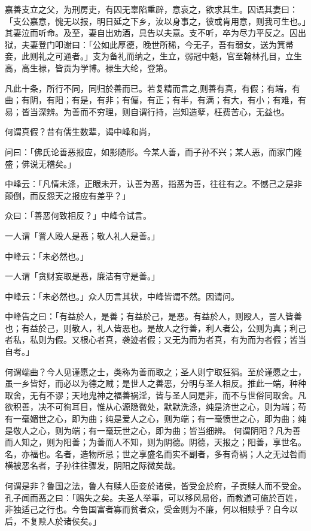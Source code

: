 \documentclass[letterpaper,10pt,english]{sphinxmanual}
\begin{document}
嘉善支立之父，为刑房吏，有囚无辜陷重辟，意哀之，欲求其生。囚语其妻曰：「支公嘉意，愧无以报，明日延之下乡，汝以身事之，彼或肯用意，则我可生也。」其妻泣而听命。及至，妻自出劝酒，具告以夫意。支不听，卒为尽力平反之。囚出狱，夫妻登门叩谢曰：「公如此厚德，晚世所稀，今无子，吾有弱女，送为箕帚妾，此则礼之可通者。」支为备礼而纳之，生立，弱冠中魁，官至翰林孔目，立生高，高生禄，皆贡为学博。禄生大纶，登第。

凡此十条，所行不同，同归於善而已。若复精而言之,则善有真，有假；有端，有曲；有阴，有阳；有是，有非；有偏，有正；有半，有满；有大，有小；有难，有易；皆当深辨。为善而不穷理，则自谓行持，岂知造孽，枉费苦心，无益也。

何谓真假？昔有儒生数辈，谒中峰和尚，

问曰：「佛氏论善恶报应，如影随形。今某人善，而子孙不兴；某人恶，而家门隆盛；佛说无稽矣。」

中峰云：「凡情未涤，正眼未开，认善为恶，指恶为善，往往有之。不憾己之是非颠倒，而反怨天之报应有差乎？」

众曰：「善恶何致相反？」中峰令试言。

一人谓「詈人殴人是恶；敬人礼人是善。」

中峰云：「未必然也。」

一人谓「贪财妄取是恶，廉洁有守是善。」

中峰云：「未必然也。」众人历言其状，中峰皆谓不然。因请问。

中峰告之曰：「有益於人，是善；有益於己，是恶。有益於人，则殴人，詈人皆善也；有益於己，则敬人，礼人皆恶也。是故人之行善，利人者公，公则为真；利己者私，私则为假。又根心者真，袭迹者假；又无为而为者真，有为而为者假；皆当自考。」

何谓端曲？今人见谨愿之士，类称为善而取之；圣人则宁取狂狷。至於谨愿之士，虽一乡皆好，而必以为德之贼；是世人之善恶，分明与圣人相反。推此一端，种种取舍，无有不谬；天地鬼神之福善祸淫，皆与圣人同是非，而不与世俗同取舍。凡欲积善，决不可徇耳目，惟从心源隐微处，默默洗涤，纯是济世之心，则为端；苟有一毫媚世之心，即为曲；纯是爱人之心，则为端；有一毫愤世之心，即为曲；纯是敬人之心，则为端；有一毫玩世之心，即为曲；皆当细辨。 何谓阴阳？凡为善而人知之，则为阳善；为善而人不知，则为阴德。阴德，天报之；阳善，享世名。名，亦福也。名者，造物所忌；世之享盛名而实不副者，多有奇祸；人之无过咎而横被恶名者，子孙往往骤发，阴阳之际微矣哉。

何谓是非？鲁国之法，鲁人有赎人臣妾於诸侯，皆受金於府，子贡赎人而不受金。孔子闻而恶之曰：「赐失之矣。夫圣人举事，可以移风易俗，而教道可施於百姓，非独适己之行也。今鲁国富者寡而贫者众，受金则为不廉，何以相赎乎？自今以后，不复赎人於诸侯矣。」
\end{document}
